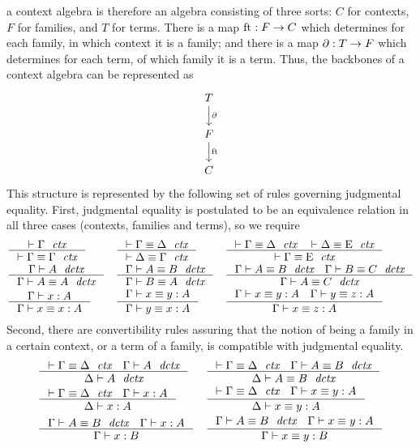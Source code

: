a context algebra is therefore an algebra consisting of three sorts: $C$ for contexts,
$F$ for families, and $T$ for terms. There is a map 
$\mathrm{ft}_{}:F\to C$ which determines for each family, in which context it is a
family; and there is a map $\partial_{}:T\to F$ which determines for each term, of
which family it is a term. Thus, the backbones of a context algebra can be represented
as
\begin{equation*}
\begin{tikzcd}
T \arrow[d,"\ebd"] \\ F \arrow[d,"\eft"] \\ C
\end{tikzcd}
\end{equation*}
This structure is represented by the following set of rules governing judgmental
equality. First, judgmental equality is postulated to be an equivalence relation
in all three cases (contexts, families and terms), so we require
\begin{align*}
& \inference
  { \jctx{\Gamma}
    }
  { \jctxeq{\Gamma}{\Gamma}
    } 
& & \inference
    { \jctxeq{\Gamma}{\Delta}
      }
    { \jctxeq{\Delta}{\Gamma}
      } 
& & \inference
    { \jctxeq{\Gamma}{\Delta}
      \jctxeq{\Delta}{\greek{E}}
      }
    { \jctxeq{\Gamma}{\greek{E}}
      }
    \\
& \inference
  { \jfam{\Gamma}{A}
    }
  { \jfameq{\Gamma}{A}{A}
    } 
& & \inference
    { \jfameq{\Gamma}{A}{B}
      }
    { \jfameq{\Gamma}{B}{A}
      }
& & \inference
    { \jfameq{\Gamma}{A}{B}
      \jfameq{\Gamma}{B}{C}
      }
    { \jfameq{\Gamma}{A}{C}
      }
    \\
& \inference
  { \jterm{\Gamma}{A}{x}
    }
  { \jtermeq{\Gamma}{A}{x}{x}
    }
& & \inference
    { \jtermeq{\Gamma}{A}{x}{y}
      }
    { \jtermeq{\Gamma}{A}{y}{x}
      }
& & \inference
    { \jtermeq{\Gamma}{A}{x}{y}
      \jtermeq{\Gamma}{A}{y}{z}
      }
    { \jtermeq{\Gamma}{A}{x}{z}
      }
\end{align*}
Second, there are convertibility rules assuring that the notion of being a
family in a certain context, or a term of a family, is compatible with judgmental
equality.
\begin{align*}
& \inference
  { \jctxeq{\Gamma}{\Delta}
    \jfam{\Gamma}{A}
    }
  { \jfam{\Delta}{A}
    }
& & \inference
    { \jctxeq{\Gamma}{\Delta}
      \jfameq{\Gamma}{A}{B}
      }
    { \jfameq{\Delta}{A}{B}
      }
    \\
& \inference
  { \jctxeq{\Gamma}{\Delta}
    \jterm{\Gamma}{A}{x}
    }
  { \jterm{\Delta}{A}{x}
    }
& & \inference
    { \jctxeq{\Gamma}{\Delta}
      \jtermeq{\Gamma}{A}{x}{y}
      }
    { \jtermeq{\Delta}{A}{x}{y}
      }
    \\
& \inference
  { \jfameq{\Gamma}{A}{B}
    \jterm{\Gamma}{A}{x}
    }
  { \jterm{\Gamma}{B}{x}
    }
& & \inference
    { \jfameq{\Gamma}{A}{B}
      \jtermeq{\Gamma}{A}{x}{y}
      }
    { \jtermeq{\Gamma}{B}{x}{y}
      }
\end{align*}

